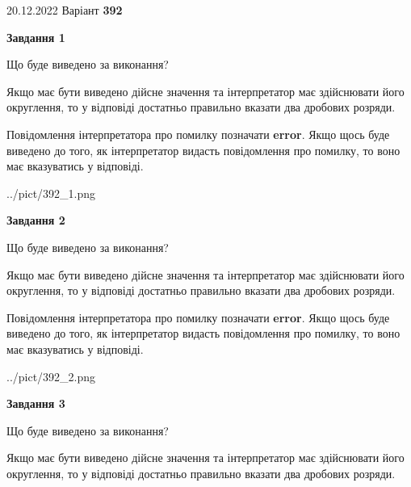\documentclass[12pt, ukrainian]{article}
\begin{document}
{20.12.2022 Варіант \No \textbf { 392 }\par}
{
\begin {Large}

{\begin {center}\textbf{Завдання 1}\end {center}}\par
Що буде виведено за виконання? \par

Якщо має бути виведено дійсне значення та інтерпретатор має здійснювати його округлення, 
то у відповіді достатньо правильно вказати два дробових розряди.

Повідомлення інтерпретатора про помилку позначати \textbf{error}.
Якщо щось буде виведено до того, як інтерпретатор видасть повідомлення про помилку, 
то воно має вказуватись у відповіді. \par

\begin{center}
	{../pict/392_1.png}
\end{center}
\newpage

{\begin {center}\textbf{Завдання 2}\end {center}}\par
Що буде виведено за виконання? \par

Якщо має бути виведено дійсне значення та інтерпретатор має здійснювати його округлення, 
то у відповіді достатньо правильно вказати два дробових розряди.

Повідомлення інтерпретатора про помилку позначати \textbf{error}.
Якщо щось буде виведено до того, як інтерпретатор видасть повідомлення про помилку, 
то воно має вказуватись у відповіді. \par

\begin{center}
	{../pict/392_2.png}
\end{center}
\newpage

{\begin {center}\textbf{Завдання 3}\end {center}}\par
Що буде виведено за виконання? \par

Якщо має бути виведено дійсне значення та інтерпретатор має здійснювати його округлення, 
то у відповіді достатньо правильно вказати два дробових розряди.


\end{Large}}
\end{document}

